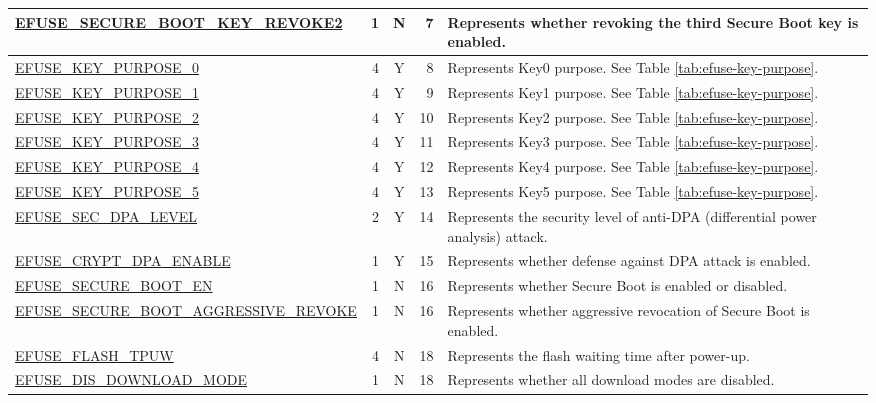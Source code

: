 \begin{longtable}[l]{ |m{8.2cm}|r|c|r|m{9cm}| }
    \hline
    \hyperref[fielddesc:EFUSESECUREBOOTKEYREVOKE2]{EFUSE\_SECURE\_BOOT\_KEY\_REVOKE2} & 1 & N & 7 & Represents whether revoking the third Secure Boot key is enabled.\\
    \hline
    \hyperref[fielddesc:EFUSEKEYPURPOSE0]{EFUSE\_KEY\_PURPOSE\_0} & 4 & Y & 8 & {Represents Key0 purpose. See Table \ref{tab:efuse-key-purpose}.} \\
    \hline
    \hyperref[fielddesc:EFUSEKEYPURPOSE1]{EFUSE\_KEY\_PURPOSE\_1} & 4 & Y & 9 & {Represents Key1 purpose. See Table \ref{tab:efuse-key-purpose}.} \\
    \hline
    \hyperref[fielddesc:EFUSEKEYPURPOSE2]{EFUSE\_KEY\_PURPOSE\_2} & 4 & Y & 10 & {Represents Key2 purpose. See Table \ref{tab:efuse-key-purpose}.} \\
    \hline
    \hyperref[fielddesc:EFUSEKEYPURPOSE3]{EFUSE\_KEY\_PURPOSE\_3} & 4 & Y & 11 & {Represents Key3 purpose. See Table \ref{tab:efuse-key-purpose}.} \\
    \hline
    \hyperref[fielddesc:EFUSEKEYPURPOSE4]{EFUSE\_KEY\_PURPOSE\_4} & 4 & Y & 12 & {Represents Key4 purpose. See Table \ref{tab:efuse-key-purpose}.} \\
    \hline
    \hyperref[fielddesc:EFUSEKEYPURPOSE5]{EFUSE\_KEY\_PURPOSE\_5} & 4 & Y & 13 & {Represents Key5 purpose. See Table \ref{tab:efuse-key-purpose}.} \\
    \hline
    \hyperref[fielddesc:EFUSESECDPALEVEL]{EFUSE\_SEC\_DPA\_LEVEL} & 2 & Y & 14 & Represents the security level of anti-DPA (differential power analysis) attack. \\
    \hline
    \hyperref[fielddesc:EFUSECRYPTDPAENABLE]{EFUSE\_CRYPT\_DPA\_ENABLE} & 1 & Y & 15 & Represents whether defense against DPA attack is enabled. \\
    \hline
    \hyperref[fielddesc:EFUSESECUREBOOTEN]{EFUSE\_SECURE\_BOOT\_EN} & 1 & N & 16 & Represents whether Secure Boot is enabled or disabled. \\
    \hline
    \hyperref[fielddesc:EFUSESECUREBOOTAGGRESSIVEREVOKE]{EFUSE\_SECURE\_BOOT\_AGGRESSIVE\_REVOKE} & 1 & N & 16 & Represents whether aggressive revocation of Secure Boot is enabled. \\
    \hline
    \hyperref[fielddesc:EFUSEFLASHTPUW]{EFUSE\_FLASH\_TPUW} & 4 & N & 18 & Represents the flash waiting time after power-up.\\
    \hline
    \hyperref[fielddesc:EFUSEDISDOWNLOADMODE]{EFUSE\_DIS\_DOWNLOAD\_MODE} & 1 & N & 18 & Represents whether all download modes are disabled.\\

\end{longtable}
